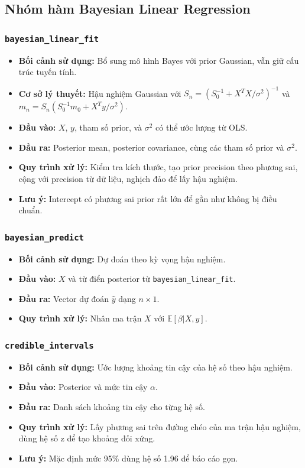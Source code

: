 \documentclass[a4paper]{article}
\newcommand{\code}[1]{\colorbox{light-gray}{\texttt{#1}}}
\begin{document}
\subsection{Nhóm hàm Bayesian Linear Regression}

\subsubsection{\code{bayesian\_linear\_fit}}
\begin{itemize}[leftmargin=*]
    \item \textbf{Bối cảnh sử dụng:} Bổ sung mô hình Bayes với prior Gaussian, vẫn giữ cấu trúc tuyến tính.
    \item \textbf{Cơ sở lý thuyết:} Hậu nghiệm Gaussian với $S_n=(S_0^{-1}+X^T X/\sigma^2)^{-1}$ và $m_n=S_n(S_0^{-1}m_0+X^T y/\sigma^2)$.
    \item \textbf{Đầu vào:} $X$, $y$, tham số prior, và $\sigma^2$ có thể ước lượng từ OLS.
    \item \textbf{Đầu ra:} Posterior mean, posterior covariance, cùng các tham số prior và $\sigma^2$.
    \item \textbf{Quy trình xử lý:} Kiểm tra kích thước, tạo prior precision theo phương sai, cộng với precision từ dữ liệu, nghịch đảo để lấy hậu nghiệm.
    \item \textbf{Lưu ý:} Intercept có phương sai prior rất lớn để gần như không bị điều chuẩn.
\end{itemize}

\subsubsection{\code{bayesian\_predict}}
\begin{itemize}[leftmargin=*]
    \item \textbf{Bối cảnh sử dụng:} Dự đoán theo kỳ vọng hậu nghiệm.
    \item \textbf{Đầu vào:} $X$ và từ điển posterior từ \texttt{bayesian\_linear\_fit}.
    \item \textbf{Đầu ra:} Vector dự đoán $\hat{y}$ dạng $n\times1$.
    \item \textbf{Quy trình xử lý:} Nhân ma trận $X$ với $\mathbb{E}[\beta|X,y]$.
\end{itemize}

\subsubsection{\code{credible\_intervals}}
\begin{itemize}[leftmargin=*]
    \item \textbf{Bối cảnh sử dụng:} Ước lượng khoảng tin cậy của hệ số theo hậu nghiệm.
    \item \textbf{Đầu vào:} Posterior và mức tin cậy $\alpha$.
    \item \textbf{Đầu ra:} Danh sách khoảng tin cậy cho từng hệ số.
    \item \textbf{Quy trình xử lý:} Lấy phương sai trên đường chéo của ma trận hậu nghiệm, dùng hệ số z để tạo khoảng đối xứng.
    \item \textbf{Lưu ý:} Mặc định mức 95\% dùng hệ số 1.96 để báo cáo gọn.
\end{itemize}
\end{document}
